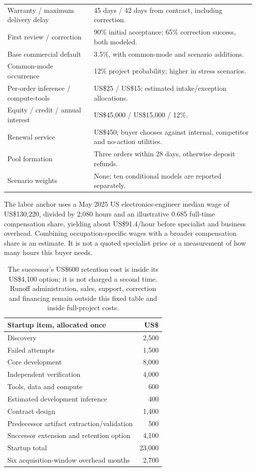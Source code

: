 \begin{longtable}{L{0.48\textwidth}L{0.43\textwidth}}
Warranty / maximum delivery delay & 45 days / 42 days from contract, including correction.\\
First review / correction & 90\% initial acceptance; 65\% correction success, both modeled.\\
Base commercial default & 3.5\%, with common-mode and scenario additions.\\
Common-mode occurrence & 12\% project probability; higher in stress scenarios.\\
Per-order inference / compute-tools & US\$25 / US\$15; estimated intake/exception allocations.\\
Equity / credit / annual interest & US\$45,000 / US\$15,000 / 12\%.\\
Renewal service & US\$450; buyer chooses against internal, competitor and no-action utilities.\\
Pool formation & Three orders within 28 days, otherwise deposit refunds.\\
Scenario weights & None; ten conditional models are reported separately.\\
\bottomrule
\end{longtable}

The labor anchor uses a May 2025 US electronics-engineer median wage of US\$130,220, divided by 2,080 hours and an illustrative 0.685 full-time compensation share, yielding about US\$91.4/hour before specialist and business overhead. Combining occupation-specific wages with a broader compensation share is an estimate. It is not a quoted specialist price or a measurement of how many hours this buyer needs.\cite{bls,ecec}

\begin{table}[htbp]
\centering\small
\begin{tabular}{L{0.64\textwidth}r}
\toprule Startup item, allocated once & US\$\\
\midrule
Discovery & 2,500\\
Failed attempts & 1,500\\
Core development & 8,000\\
Independent verification & 4,000\\
Tools, data and compute & 600\\
Estimated development inference & 400\\
Contract design & 1,400\\
Predecessor artifact extraction/validation & 500\\
Successor extension and retention option & 4,100\\
\midrule
Startup total & 23,000\\
Six acquisition-window overhead months & 2,700\\
\bottomrule
\end{tabular}
\caption{The successor's US\$600 retention cost is inside its US\$4,100 option; it is not charged a second time. Runoff administration, sales, support, correction and financing remain outside this fixed table and inside full-project costs.}
\end{table}


